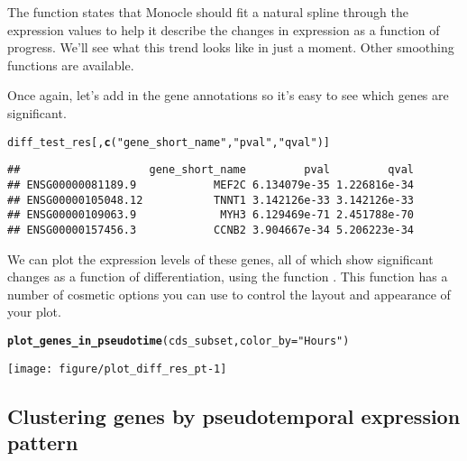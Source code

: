 \documentclass[10pt,oneside]{article}\usepackage[]{graphicx}\usepackage[]{color}
\makeatletter
\def\maxwidth{ %
  \ifdim\Gin@nat@width>\linewidth
    \linewidth
  \else
    \Gin@nat@width
  \fi
}
\newcommand{\hlstr}[1]{\textcolor[rgb]{0.192,0.494,0.8}{#1}}%
\newcommand{\hlstd}[1]{\textcolor[rgb]{0.345,0.345,0.345}{#1}}%
\newcommand{\hlkwc}[1]{\textcolor[rgb]{0.333,0.667,0.333}{#1}}%
\newcommand{\hlkwd}[1]{\textcolor[rgb]{0.737,0.353,0.396}{\textbf{#1}}}%
\newenvironment{kframe}{%
 \def\at@end@of@kframe{}%
 \ifinner\ifhmode%
  \def\at@end@of@kframe{\end{minipage}}%
  \begin{minipage}{\columnwidth}%
 \fi\fi%
 \def\FrameCommand##1{\hskip\@totalleftmargin \hskip-\fboxsep
 \colorbox{shadecolor}{##1}\hskip-\fboxsep
     \hskip-\linewidth \hskip-\@totalleftmargin \hskip\columnwidth}%
 \MakeFramed {\advance\hsize-\width
   \@totalleftmargin\z@ \linewidth\hsize
   \@setminipage}}%
 {\par\unskip\endMakeFramed%
 \at@end@of@kframe}
\newenvironment{knitrout}{}{} %
\makeatother
\begin{document}
The  function states that Monocle should fit a natural spline through the expression values to help it describe the changes in expression as a function of progress. We'll see what this trend looks like in just a moment. Other smoothing functions are available.

Once again, let's add in the gene annotations so it's easy to see which genes are significant.
\begin{knitrout}
\color{fgcolor}\begin{kframe}
\begin{alltt}
\hlstd{diff_test_res[,}\hlkwd{c}\hlstd{(}\hlstr{"gene_short_name"}\hlstd{,} \hlstr{"pval"}\hlstd{,} \hlstr{"qval"}\hlstd{)]}
\end{alltt}
\begin{verbatim}
##                    gene_short_name         pval         qval
## ENSG00000081189.9            MEF2C 6.134079e-35 1.226816e-34
## ENSG00000105048.12           TNNT1 3.142126e-33 3.142126e-33
## ENSG00000109063.9             MYH3 6.129469e-71 2.451788e-70
## ENSG00000157456.3            CCNB2 3.904667e-34 5.206223e-34
\end{verbatim}
\end{kframe}
\end{knitrout}

We can plot the expression levels of these genes, all of which show significant changes as a function of differentiation, using the function . This function has a number of cosmetic options you can use to control the layout and appearance of your plot.

\begin{knitrout}
\color{fgcolor}\begin{kframe}
\begin{alltt}
\hlkwd{plot_genes_in_pseudotime}\hlstd{(cds_subset,} \hlkwc{color_by}\hlstd{=}\hlstr{"Hours"}\hlstd{)}
\end{alltt}
\end{kframe}

{\centering \texttt{[image: figure/plot\_diff\_res\_pt-1]} 

}



\end{knitrout}

\subsection{Clustering genes by pseudotemporal expression pattern}
\end{document}
